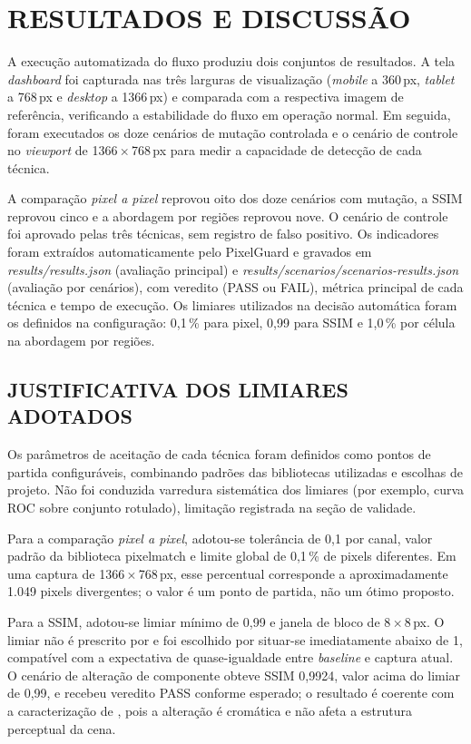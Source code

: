 \documentclass{UNESC}
\begin{document}
\section{RESULTADOS E DISCUSSÃO}

A execução automatizada do fluxo produziu dois conjuntos de resultados. A tela \textit{dashboard} foi capturada nas três larguras de visualização (\textit{mobile} a 360\,px, \textit{tablet} a 768\,px e \textit{desktop} a 1366\,px) e comparada com a respectiva imagem de referência, verificando a estabilidade do fluxo em operação normal. Em seguida, foram executados os doze cenários de mutação controlada e o cenário de controle no \emph{viewport} de 1366\,$\times$\,768\,px para medir a capacidade de detecção de cada técnica.

A comparação \emph{pixel a pixel} reprovou oito dos doze cenários com mutação, a SSIM reprovou cinco e a abordagem por regiões reprovou nove. O cenário de controle foi aprovado pelas três técnicas, sem registro de falso positivo. Os indicadores foram extraídos automaticamente pelo PixelGuard e gravados em \emph{results/results.json} (avaliação principal) e \emph{results/scenarios/scenarios-results.json} (avaliação por cenários), com veredito (PASS ou FAIL), métrica principal de cada técnica e tempo de execução. Os limiares utilizados na decisão automática foram os definidos na configuração: 0,1\,\% para pixel, 0,99 para SSIM e 1,0\,\% por célula na abordagem por regiões.

\subsection{JUSTIFICATIVA DOS LIMIARES ADOTADOS}
Os parâmetros de aceitação de cada técnica foram definidos como pontos de partida configuráveis, combinando padrões das bibliotecas utilizadas e escolhas de projeto. Não foi conduzida varredura sistemática dos limiares (por exemplo, curva ROC sobre conjunto rotulado), limitação registrada na seção de validade.

Para a comparação \emph{pixel a pixel}, adotou-se tolerância de 0,1 por canal, valor padrão da biblioteca pixelmatch e limite global de 0,1\,\% de pixels diferentes. Em uma captura de 1366\,$\times$\,768\,px, esse percentual corresponde a aproximadamente 1.049 pixels divergentes; o valor é um ponto de partida, não um ótimo proposto.

Para a SSIM, adotou-se limiar mínimo de 0,99 e janela de bloco de 8\,$\times$\,8\,px. O limiar não é prescrito por  e foi escolhido por situar-se imediatamente abaixo de 1, compatível com a expectativa de quase-igualdade entre \emph{baseline} e captura atual. O cenário de alteração de componente obteve SSIM 0,9924, valor acima do limiar de 0,99, e recebeu veredito PASS conforme esperado; o resultado é coerente com a caracterização de , pois a alteração é cromática e não afeta a estrutura perceptual da cena.
\end{document}
